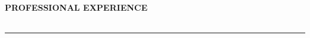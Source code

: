 \begin{center}
\textbf{PROFESSIONAL EXPERIENCE}
\end{center}

\vspace{0.3cm}

\begin{longtable}{p{}p{}}




\end{longtable}

\vspace{0.5cm}
\rule{\textwidth}{0.5pt}
\vspace{0.5cm} 